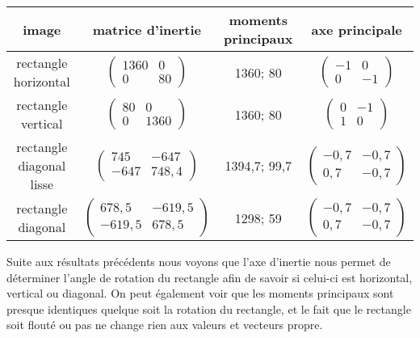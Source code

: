 \documentclass{article}
\begin{document}
  \begin{center}
    \begin{tabular}{|c|c|c|c|}
      \hline
      \textbf{image} & \textbf{matrice d'inertie} & \textbf{moments principaux} & \textbf{axe principale} \\
      \hline
      rectangle horizontal & $\begin{pmatrix}
			      1360 & 0 \\
			      0 & 80 
			      \end{pmatrix}$ 
			  & 1360; 80
			  &  $\begin{pmatrix}
			      -1 & 0 \\
			      0 & -1 
			      \end{pmatrix}$\\
      \hline
      rectangle vertical & $\begin{pmatrix}
			      80 & 0 \\
			      0 & 1360 
			      \end{pmatrix}$
			  & 1360; 80
			  &  $\begin{pmatrix}
			      0 & -1 \\
			      1 & 0 
			      \end{pmatrix}$\\
      \hline
      rectangle diagonal lisse & $\begin{pmatrix}
			      745 & -647 \\
			      -647 & 748,4 
			      \end{pmatrix}$
			  & 1394,7; 99,7
			  &  $\begin{pmatrix}
			      -0,7 & -0,7 \\
			      0,7 & -0,7 
			      \end{pmatrix}$\\
      \hline
      rectangle diagonal & $\begin{pmatrix}
			      678,5 & -619,5 \\
			      -619,5 & 678,5 
			      \end{pmatrix}$
			  & 1298; 59
			  &  $\begin{pmatrix}
			      -0,7 & -0,7 \\
			      0,7 & -0,7 
			      \end{pmatrix}$\\
      \hline
    \end{tabular}
  \end{center}
  
  Suite aux résultats précédents nous voyons que l'axe d'inertie nous permet de déterminer 
  l'angle de rotation du rectangle afin de savoir si celui-ci est horizontal, vertical ou diagonal. 
  On peut également voir que les moments principaux sont presque identiques quelque soit la rotation du rectangle,
  et le fait que le rectangle soit flouté ou pas ne change rien aux valeurs et vecteurs propre.\\
  
\end{document}
